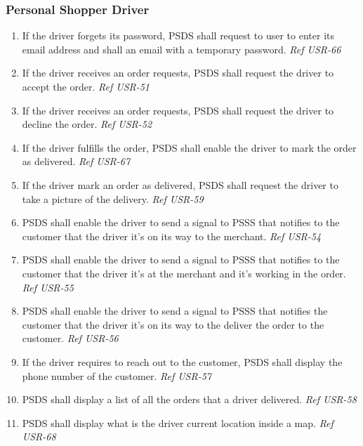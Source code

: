 \pagebreak

\subsubsection{Personal Shopper Driver}
\begin{enumerate}[resume, label=SY-\arabic*]
    \item  If the driver forgets its password, PSDS shall request to user to 
    enter its email address and shall an email with a temporary password.
    \newline \textit{Ref USR-66} 
    \item  If the driver receives an order requests, PSDS shall request the 
    driver to accept the order.
    \newline \textit{Ref USR-51} 
    \item  If the driver receives an order requests, PSDS shall request the 
    driver to decline the order.
    \newline \textit{Ref USR-52} 
    \item  If the driver fulfills the order, PSDS shall enable the driver to 
    mark the order as delivered.
	\newline \textit{Ref USR-67} 
    \item  If the driver mark an order as delivered, PSDS shall request the 
    driver to take a picture of the delivery.
    \newline \textit{Ref USR-59} 
    \item  PSDS shall enable the driver to send a signal to PSSS that notifies 
    to the customer that the driver it's on its way to the merchant.
    \newline \textit{Ref USR-54} 
    \item  PSDS shall enable the driver to send a signal to PSSS that notifies 
    to the customer that the driver it's at the merchant and it's working 
    in the order.
    \newline \textit{Ref USR-55} 
    \item  PSDS shall enable the driver to send a signal to PSSS that notifies 
    the customer that the driver it's on its way to the deliver the order to 
    the customer.
    \newline \textit{Ref USR-56} 
    \item  If the driver requires to reach out to the customer, PSDS shall 
    display the phone number of the customer.
    \newline \textit{Ref USR-57} 
    \item  PSDS shall display a list of all the orders that a driver delivered.
    \newline \textit{Ref USR-58} 
    \item  PSDS shall display what is the driver current location inside a map.
    \newline \textit{Ref USR-68} 
\end{enumerate}

